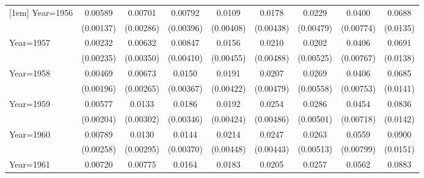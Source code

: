 \begin{table}[htbp]
\begin{tabular}{l*{8}{c}}
[1em]
Year=1956           &     0.00589\sym{***}&     0.00701\sym{**} &     0.00792\sym{**} &      0.0109\sym{***}&      0.0178\sym{***}&      0.0229\sym{***}&      0.0400\sym{***}&      0.0688\sym{***}\\
                    &   (0.00137)         &   (0.00286)         &   (0.00396)         &   (0.00408)         &   (0.00438)         &   (0.00479)         &   (0.00774)         &    (0.0135)         \\
[1em]
Year=1957           &     0.00232         &     0.00632\sym{*}  &     0.00847\sym{**} &      0.0156\sym{***}&      0.0210\sym{***}&      0.0202\sym{***}&      0.0406\sym{***}&      0.0691\sym{***}\\
                    &   (0.00235)         &   (0.00350)         &   (0.00410)         &   (0.00455)         &   (0.00488)         &   (0.00525)         &   (0.00767)         &    (0.0138)         \\
[1em]
Year=1958           &     0.00469\sym{**} &     0.00673\sym{**} &      0.0150\sym{***}&      0.0191\sym{***}&      0.0207\sym{***}&      0.0269\sym{***}&      0.0406\sym{***}&      0.0685\sym{***}\\
                    &   (0.00196)         &   (0.00265)         &   (0.00367)         &   (0.00422)         &   (0.00479)         &   (0.00558)         &   (0.00753)         &    (0.0141)         \\
[1em]
Year=1959           &     0.00577\sym{***}&      0.0133\sym{***}&      0.0186\sym{***}&      0.0192\sym{***}&      0.0254\sym{***}&      0.0286\sym{***}&      0.0454\sym{***}&      0.0836\sym{***}\\
                    &   (0.00204)         &   (0.00302)         &   (0.00346)         &   (0.00424)         &   (0.00486)         &   (0.00501)         &   (0.00718)         &    (0.0142)         \\
[1em]
Year=1960           &     0.00789\sym{***}&      0.0130\sym{***}&      0.0144\sym{***}&      0.0214\sym{***}&      0.0247\sym{***}&      0.0263\sym{***}&      0.0559\sym{***}&      0.0900\sym{***}\\
                    &   (0.00258)         &   (0.00295)         &   (0.00370)         &   (0.00448)         &   (0.00443)         &   (0.00513)         &   (0.00799)         &    (0.0151)         \\
[1em]
Year=1961           &     0.00720\sym{***}&     0.00775\sym{***}&      0.0164\sym{***}&      0.0183\sym{***}&      0.0205\sym{***}&      0.0257\sym{***}&      0.0562\sym{***}&      0.0883\sym{***}\\

\end{tabular}
\end{table}
